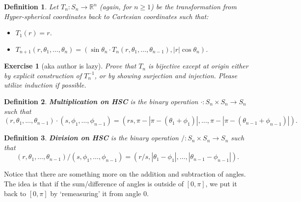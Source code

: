 \documentclass{article}
\theoremstyle{plain}
\newtheorem{definition}{Definition}[section]
\newtheorem{exercise}{Exercise}[section]
\begin{document}
\begin{definition}\label{hsc}
Let $T_n: S_n \rightarrow \mathbb{R}^n$ (again, for $n \ge 1$) be the transformation from Hyper-spherical coordinates back to Cartesian coordinates such that:
\begin{itemize}
	\item $T_1(r) = r$.
	\item $T_{n+1}(r, \theta_1, \ldots, \theta_n) = ( \sin{\theta_n} \cdot T_n(r, \theta_1, \ldots, \theta_{n-1}), |r| \cos{\theta_n})$.
\end{itemize}
\end{definition}
\begin{exercise}[aka author is lazy]
Prove that $T_n$ is bijective \textit{except at origin} either by explicit construction of $T_n^{-1}$, or by showing surjection and injection. Please utilize induction if possible.
\end{exercise}
\begin{definition}
\textbf{Multiplication on HSC} is the binary operation $\cdot: S_n \times S_n \rightarrow S_n$ such that $$(r, \theta_1, \ldots, \theta_{n-1}) \cdot (s, \phi_1, \ldots, \phi_{n-1}) = (rs, \pi - |\pi - (\theta_1 + \phi_1)|, \ldots, \pi - |\pi - (\theta_{n-1} + \phi_{n-1})|).$$
\end{definition}
\begin{definition}
\textbf{Division on HSC} is the binary operation $/: S_n \times S_n \rightarrow S_n$ such that $$(r, \theta_1, \ldots, \theta_{n-1}) / (s, \phi_1, \ldots, \phi_{n-1}) = (r/s, |\theta_1 - \phi_1|, \ldots, |\theta_{n-1} - \phi_{n-1}|).$$
\end{definition}
Notice that there are something more on the addition and subtraction of angles. The idea is that if the sum/difference of angles is outside of $[0,\pi]$, we put it back to $[0,\pi]$ by `remeasuring' it from angle $0$.
\end{document}
